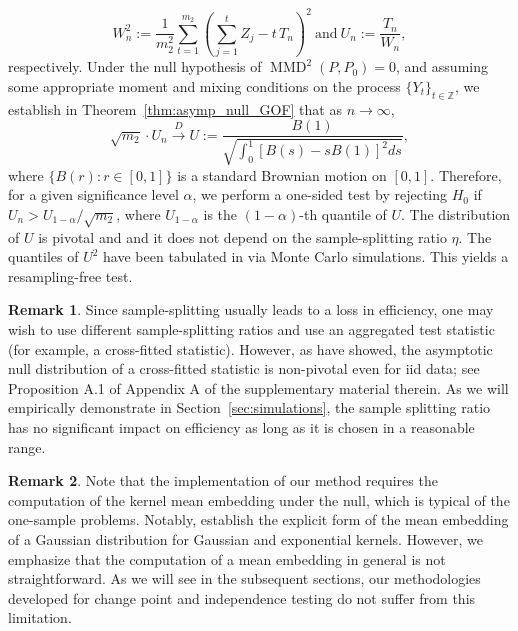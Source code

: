 \documentclass[11pt]{article}
\theoremstyle{plain}
\theoremstyle{definition}
\newtheorem{remark}{Remark}
\theoremstyle{remark}
\begin{document}
\begin{equation}
\label{eqn:Un_GOF}
    W_n^2:=\frac{1}{m_2^2}\sum_{t=1}^{m_2}\left(\sum_{j=1}^t Z_j-t\, T_n\right)^2~\mbox{and}~ U_n:=\frac{T_n}{W_n},
\end{equation}
respectively. 
Under the null hypothesis of $\operatorname{MMD}^2(P,P_0)=0$, and assuming some appropriate moment and mixing conditions on the process $\{Y_t\}_{t \in \mathbb{Z}}$, we establish in Theorem~\ref{thm:asymp_null_GOF} that as $n \to \infty$,
\begin{equation}\label{eqn:defn_of_U}
    \sqrt{m_2}\cdot U_n\overset{D}{\to}U:=\frac{B(1)}{\sqrt{ \int_{0}^{1} \left[B(s)-sB(1)\right]^2 ds}},
\end{equation}
where $\{B(r):r\in [0,1]\}$ is a standard Brownian motion on $[0,1].$ Therefore, for a given significance level $\alpha$, we perform a one-sided test by rejecting $H_0$ if $U_n>U_{1-\alpha}/\sqrt{m_2}$, where $U_{1-\alpha}$ is the $(1-\alpha)$-th quantile of $U$. The distribution of $U$ is pivotal and and it does not depend on the sample-splitting ratio $\eta$. The quantiles of $U^2$ have been tabulated in \cite{lobato2001testing} via Monte Carlo simulations. This yields a resampling-free test.

\begin{remark}
    Since sample-splitting usually leads to a loss in efficiency, one may wish to use different sample-splitting ratios and use an aggregated test statistic (for example, a cross-fitted statistic). However, as \cite{kim2024dimension} have showed, the asymptotic null distribution of a cross-fitted statistic is non-pivotal even for iid data; see Proposition A.1 of Appendix A of the supplementary material therein.  
    As we will empirically demonstrate in Section~\ref{sec:simulations}, the sample splitting ratio has no significant impact on efficiency as long as it is chosen in a reasonable range.
\end{remark}
\begin{remark}
    Note that the implementation of our method requires the computation of the kernel mean embedding under the null, which is typical of the one-sample problems. Notably, \cite{kellner2019one} establish the explicit form of the mean embedding of a Gaussian distribution for Gaussian and exponential kernels. However, we emphasize that the  \noindent computation of a mean embedding in general is not straightforward. As we will see in the subsequent sections, our methodologies developed for change point and independence testing do not suffer from this limitation.
\end{remark}
\end{document}
